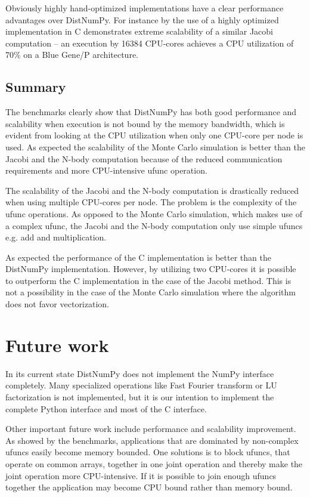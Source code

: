 \documentclass{sigplanconf}
\begin{document}
Obviously highly hand-optimized implementations have a clear performance advantages over DistNumPy. For instance by the use of a highly optimized implementation in C \cite{Kristensen09} demonstrates extreme scalability of a similar Jacobi computation -- an execution by 16384 CPU-cores achieves a CPU utilization of 70\% on a Blue Gene/P architecture. 

\subsection{Summary}
The benchmarks clearly show that DistNumPy has both good performance and scalability when execution is not bound by the memory bandwidth, which is evident from looking at the CPU utilization when only one CPU-core per node is used. As expected the scalability of the Monte Carlo simulation is better than the Jacobi and the N-body computation because of the reduced communication requirements and more CPU-intensive ufunc operation. 

The scalability of the Jacobi and the N-body computation is drastically reduced when using multiple CPU-cores per node. The problem is the complexity of the ufunc operations. As opposed to the Monte Carlo simulation, which makes use of a complex ufunc, the Jacobi and the N-body computation only use simple ufuncs e.g. add and multiplication.

As expected the performance of the C implementation is better than the DistNumPy implementation. However, by utilizing two CPU-cores it is possible to outperform the C implementation in the case of the Jacobi method. This is not a possibility in the case of the Monte Carlo simulation where the algorithm does not favor vectorization.

\section{Future work}
In its current state DistNumPy does not implement the NumPy interface completely. Many specialized operations like Fast Fourier transform or LU factorization is not implemented, but it is our intention to implement the complete Python interface and most of the C interface.

Other important future work include performance and scalability improvement. As showed by the benchmarks, applications that are dominated by non-complex ufuncs easily become memory bounded. One solutions is to block ufuncs, that operate on common arrays, together in one joint operation and thereby make the joint operation more CPU-intensive. If it is possible to join enough ufuncs together the application may become CPU bound rather than memory bound.
\end{document}
